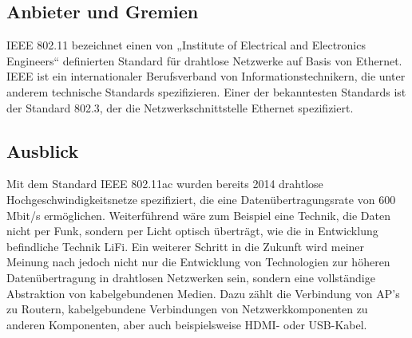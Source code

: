 \begin{multicols}{3}


\subsection*{Anbieter und Gremien}
IEEE 802.11 bezeichnet einen von „Institute of Electrical and Electronics Engineers“ definierten Standard für drahtlose Netzwerke auf Basis von Ethernet. IEEE ist ein internationaler Berufsverband von Informationstechnikern, die unter anderem technische Standards spezifizieren. Einer der bekanntesten Standards ist der Standard 802.3, der die Netzwerkschnittstelle Ethernet spezifiziert.

\subsection*{Ausblick}
Mit dem Standard IEEE 802.11ac wurden bereits 2014 drahtlose Hochgeschwindigkeitsnetze spezifiziert, die eine Datenübertragungsrate von 600 Mbit/s ermöglichen. Weiterführend wäre zum Beispiel eine Technik, die Daten nicht per Funk, sondern per Licht optisch überträgt, wie die in Entwicklung befindliche Technik LiFi.
Ein weiterer Schritt in die Zukunft wird meiner Meinung nach jedoch nicht nur die Entwicklung von Technologien zur höheren Datenübertragung in drahtlosen Netzwerken sein, sondern eine vollständige Abstraktion von kabelgebundenen Medien. Dazu zählt die Verbindung von AP's zu Routern, kabelgebundene Verbindungen von Netzwerkkomponenten zu anderen Komponenten, aber auch beispielsweise HDMI- oder USB-Kabel.

\printbibliography[segment=13,heading=subbibliography]

\end{multicols}
\newpage

